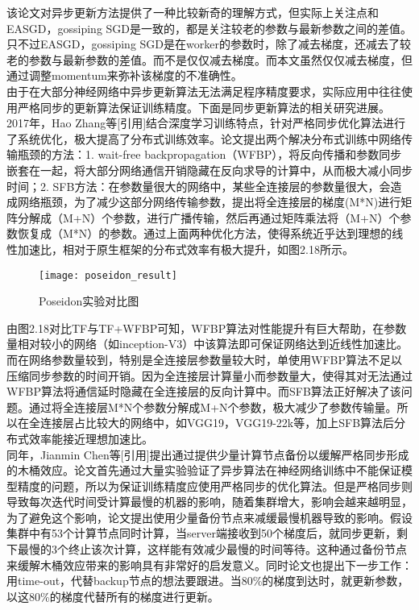 该论文对异步更新方法提供了一种比较新奇的理解方式，但实际上关注点和EASGD，gossiping SGD是一致的，都是关注较老的参数与最新参数之间的差值。只不过EASGD，gossiping SGD是在worker的参数时，除了减去梯度，还减去了较老的参数与最新参数的差值。而不是仅仅减去梯度。而本文虽然仅仅减去梯度，但通过调整momentum来弥补该梯度的不准确性。\\
由于在大部分神经网络中异步更新算法无法满足程序精度要求，实际应用中往往使用严格同步的更新算法保证训练精度。下面是同步更新算法的相关研究进展。\\
2017年，Hao Zhang等[引用]结合深度学习训练特点，针对严格同步优化算法进行了系统优化，极大提高了分布式训练效率。论文提出两个解决分布式训练中网络传输瓶颈的方法：1. wait-free backpropagation（WFBP），将反向传播和参数同步嵌套在一起，将大部分网络通信开销隐藏在反向求导的计算中，从而极大减小同步时间；2. SFB方法：在参数量很大的网络中，某些全连接层的参数量很大，会造成网络瓶颈，为了减少这部分网络传输参数，提出将全连接层的梯度(M*N)进行矩阵分解成（M+N）个参数，进行广播传输，然后再通过矩阵乘法将（M+N）个参数恢复成（M*N）的参数。通过上面两种优化方法，使得系统近乎达到理想的线性加速比，相对于原生框架的分布式效率有极大提升，如图2.18所示。\\
\begin{figure}[htp]
\centering
\texttt{[image: poseidon\_result]}
\caption{Poseidon实验对比图}
\end{figure}
由图2.18对比TF与TF+WFBP可知，WFBP算法对性能提升有巨大帮助，在参数量相对较小的网络（如inception-V3）中该算法即可保证网络达到近线性加速比。而在网络参数量较到，特别是全连接层参数量较大时，单使用WFBP算法不足以压缩同步参数的时间开销。因为全连接层计算量小而参数量大，使得其对无法通过WFBP算法将通信延时隐藏在全连接层的反向计算中。而SFB算法正好解决了该问题。通过将全连接层M*N个参数分解成M+N个参数，极大减少了参数传输量。所以在全连接层占比较大的网络中，如VGG19，VGG19-22k等，加上SFB算法后分布式效率能接近理想加速比。\\
同年，Jianmin Chen等[引用]提出通过提供少量计算节点备份以缓解严格同步形成的木桶效应。论文首先通过大量实验验证了异步算法在神经网络训练中不能保证模型精度的问题，所以为保证训练精度应使用严格同步的优化算法。但是严格同步则导致每次迭代时间受计算最慢的机器的影响，随着集群增大，影响会越来越明显，为了避免这个影响，论文提出使用少量备份节点来减缓最慢机器导致的影响。假设集群中有53个计算节点同时计算，当server端接收到50个梯度后，就同步更新，剩下最慢的3个终止该次计算，这样能有效减少最慢的时间等待。这种通过备份节点来缓解木桶效应带来的影响具有非常好的启发意义。同时论文也提出下一步工作：用time-out，代替backup节点的想法要跟进。当80\%的梯度到达时，就更新参数，以这80\%的梯度代替所有的梯度进行更新。\\
